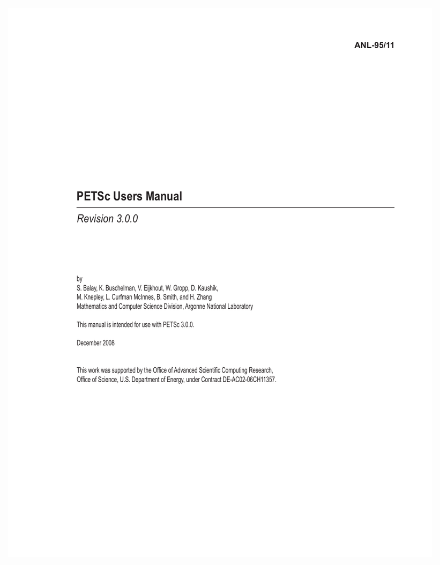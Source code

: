 \documentclass[twoside,11pt]{../sty/report_petsc}
\begin{document}
\pagestyle{empty}
\begin{figure}[hbt]
\centerline{\includegraphics{titlepage1}}
\end{figure}
\end{document}
